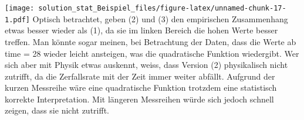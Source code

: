 \documentclass[
]{article}
\begin{document}
\texttt{[image: solution\_stat\_Beispiel\_files/figure-latex/unnamed-chunk-17-1.pdf]}
Optisch betrachtet, geben (2) und (3) den empirischen Zusammenhang etwas
besser wieder als (1), da sie im linken Bereich die hohen Werte besser
treffen. Man könnte sogar meinen, bei Betrachtung der Daten, dass die
Werte ab time = 28 wieder leicht ansteigen, was die quadratische
Funktion wiedergibt. Wer sich aber mit Physik etwas auskennt, weiss,
dass Version (2) physikalisch nicht zutrifft, da die Zerfallsrate mit
der Zeit immer weiter abfällt. Aufgrund der kurzen Messreihe wäre eine
quadratische Funktion trotzdem eine statistisch korrekte Interpretation.
Mit längeren Messreihen würde sich jedoch schnell zeigen, dass sie nicht
zutrifft.
\end{document}
